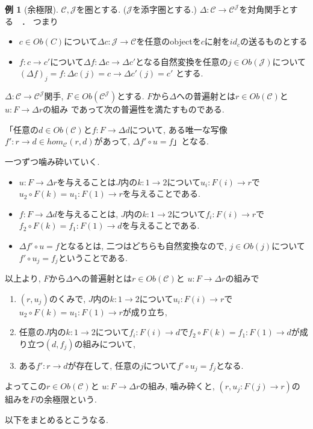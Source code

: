 \documentclass[dvipdfmx,a4paper,11pt]{report}
\theoremstyle{definition}
\newtheorem{exa}[thm]{例}
\begin{document}
\begin{exa}[余極限]
$\mathcal{C}, \mathcal{J}$を圏とする. ($\mathcal{J}$を添字圏とする.)
$\Delta : \mathcal{C} \to \mathcal{C}^{\mathcal{J}}$を対角関手とする　．
つまり
\begin{itemize}
\item$c \in Ob(C)$について$\Delta c : \mathcal{J} \to \mathcal{C}$を任意のobjectを$c$に射を$id_c$の送るものとする
\item  $f: c \to c'$について$\Delta f : \Delta c \to \Delta c'$となる自然変換を任意の$j \in Ob(\mathcal{J})$について$(\Delta f)_{j}=f : \Delta c(j) = c \to \Delta c' (j)=c' $ とする.
\end{itemize}

$\Delta : \mathcal{C} \to \mathcal{C}^{\mathcal{J}}$関手, 
$F \in Ob(\mathcal{C}^{\mathcal{J}})$とする.
$F$から$\Delta $への普遍射とは$r \in Ob(\mathcal{C})$と $u: F \to \Delta r$の組み
であって次の普遍性を満たすものである.

「任意の$d \in Ob(\mathcal{C})$と$f : F\to \Delta d$について, ある唯一な写像$f' : r \to d \in hom_{\mathcal{C}}(r,d)$があって, $\Delta f' \circ u =f$」となる.

一つずつ噛み砕いていく.
\begin{itemize}
\item $u: F \to \Delta r$を与えることは$J$内の$k : 1\to 2$について$u_i : F(i) \to r$で$u_2 \circ F(k) = u_1 : F(1) \to r$を与えることである.
\item $f : F\to \Delta d$を与えることは, $J$内の$k : 1\to 2$について$f_i : F(i) \to r$で$f_2 \circ F(k) = f_1 : F(1) \to d$を与えることである.
\item  $\Delta f' \circ u =f$となるとは, 二つはどちらも自然変換なので, $j \in Ob(j)$について$f' \circ u_j = f_j$ということである.
\end{itemize}
以上より, $F$から$\Delta $への普遍射とは$r \in Ob(\mathcal{C})$と $u: F \to \Delta r$の組みで
\begin{enumerate}
\item $(r, u_j)$のくみで, $J$内の$k : 1\to 2$について$u_i : F(i) \to r$で$u_2 \circ F(k) = u_1 : F(1) \to r$が成り立ち, 
\item 任意の$J$内の$k : 1\to 2$について$f_i : F(i) \to d$で$f_2 \circ F(k) = f_1 : F(1) \to d$が成り立つ$(d, f_j)$の組みについて,
\item ある$f' : r \to d$が存在して, 任意の$j$について$f' \circ u_j = f_j$となる.
\end{enumerate}
よってこの$r \in Ob(\mathcal{C})$と $u: F \to \Delta r$の組み, 噛み砕くと,
$(r, u_j : F(j) \to r)$の組みを$F$の余極限という. 
\end{exa}
以下をまとめるとこうなる. 
\end{document}
